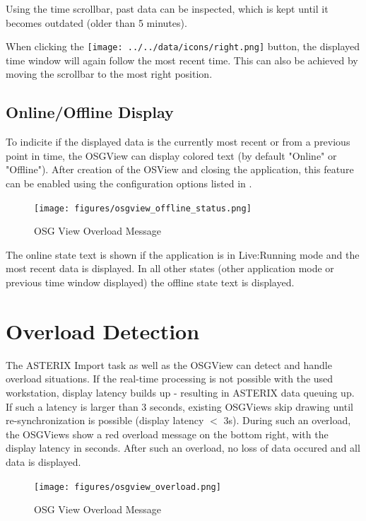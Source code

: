 Using the time scrollbar, past data can be inspected, which is kept until it becomes outdated (older than 5 minutes).

When clicking the \texttt{[image: ../../data/icons/right.png]} button, the displayed time window will again follow the most recent time. This can also be achieved by moving the scrollbar to the most right position.

\subsection{Online/Offline Display}

To indicite if the displayed data is the currently most recent or from a previous point in time, the OSGView can display colored text (by default "Online" or "Offline"). After creation of the OSView and closing the application, this feature can be enabled using the configuration options listed in .

\begin{figure}[H]
    \hspace*{-2.5cm}
    \texttt{[image: figures/osgview\_offline\_status.png]}
  \caption{OSG View Overload Message}
\end{figure} 

The online state text is shown if the application is in Live:Running mode and the most recent data is displayed. In all other states (other application mode or previous time window displayed) the offline state text is displayed.


\section{Overload Detection}

The ASTERIX Import task as well as the OSGView can detect and handle overload situations. If the real-time processing is not possible with the used workstation, display latency builds up - resulting in ASTERIX data queuing up. \\

If such a latency is larger than 3 seconds,  existing OSGViews skip drawing until re-synchronization is possible (display latency $<$ 3s). During such an overload, the OSGViews show a red overload message on the bottom right, with the display latency in seconds. After such an overload, no loss of data occured and all data is displayed. \\

\begin{figure}[H]
    \hspace*{-2.5cm}
    \texttt{[image: figures/osgview\_overload.png]}
  \caption{OSG View Overload Message}
\end{figure} 

